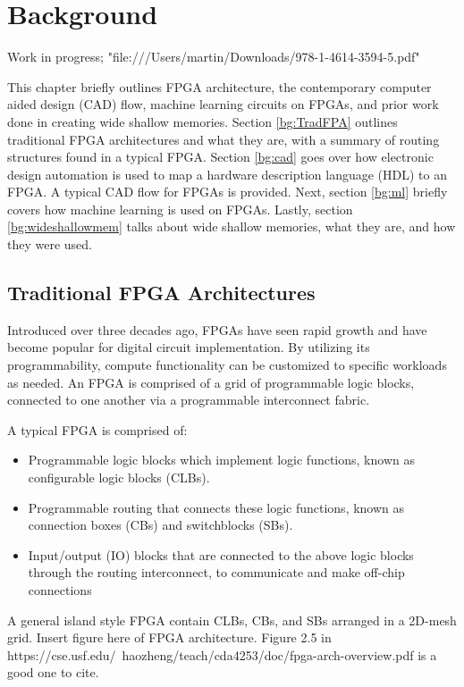 
\chapter{Background}
\label{ch:Background}

Work in progress; "file:///Users/martin/Downloads/978-1-4614-3594-5.pdf"

This chapter briefly outlines FPGA architecture, the contemporary computer aided design (CAD) flow, machine learning circuits on FPGAs, and prior work done in creating wide shallow memories. Section \ref{bg:TradFPA} outlines traditional FPGA architectures and what they are, with a summary of routing structures found in a typical FPGA. Section \ref{bg:cad} goes over how electronic design automation is used to map a hardware description language (HDL) to an FPGA. A typical CAD flow for FPGAs is provided. Next, section \ref{bg:ml} briefly covers how machine learning is used on FPGAs.
Lastly, section \ref{bg:wideshallowmem} talks about wide shallow memories, what they are, and how they were used. 


\section{Traditional FPGA Architectures}
\label{bg:TradFPGA}

Introduced over three decades ago, FPGAs have seen rapid growth and have become popular for digital circuit implementation. By utilizing its programmability, compute functionality can be customized to specific workloads as needed. An FPGA is comprised of a grid of programmable logic blocks, connected to one another via a programmable interconnect fabric.

A typical FPGA is comprised of:
\begin{itemize}
    \item Programmable logic blocks which implement logic functions, known as configurable logic blocks (CLBs).
    \item Programmable routing that connects these logic functions, known as connection boxes (CBs) and switchblocks (SBs).
    \item Input/output (IO) blocks that are connected to the above logic blocks through the routing interconnect, to communicate and make off-chip connections
\end{itemize}

A general island style FPGA contain CLBs, CBs, and SBs arranged in a 2D-mesh grid.
Insert figure here of FPGA architecture. Figure 2.5 in https://cse.usf.edu/~haozheng/teach/cda4253/doc/fpga-arch-overview.pdf is a good one to cite.


